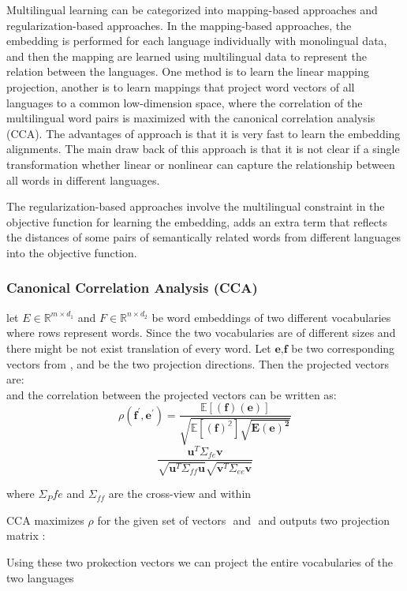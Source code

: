 Multilingual learning can be categorized into mapping-based approaches and regularization-based approaches. In the mapping-based approaches, the embedding is performed for each language individually with monolingual data, and then the mapping are learned using multilingual data to represent the relation between the languages. One method is to learn the linear mapping projection, another is to learn mappings that project word vectors of all languages to a common low-dimension space, where the correlation of the multilingual word pairs is maximized with the canonical correlation analysis (CCA). The advantages of approach is that it is very fast to learn the embedding alignments. The main draw back of this approach is that it is not clear if a single transformation whether linear or nonlinear can capture the relationship between all words in different languages.

The regularization-based approaches involve the multilingual constraint in the objective function for learning the embedding, adds an extra term that reflects the distances of some pairs of semantically related words from different languages into the objective function. 

\subsubsection{Canonical Correlation Analysis (CCA)}

let $E \in \mathbb{R}^{m \times d_1}$ and $F \in \mathbb{R}^{n \times d_2}$ be word embeddings of two different vocabularies where rows represent words. Since the two vocabularies are of different sizes and there might be not exist translation of every word. Let $\bm{e}$,$\bm{f}$ be two corresponding vectors from , and be the two projection directions. Then the projected vectors are:
\[ \] 
and the correlation between the projected vectors can be written as:
 \[\rho(\bm{f}^{\prime}, \bm{e}^{\prime}) = \frac{\mathbb{E[(\bm{f})(\bm{e})]}}{\sqrt{\mathbb{E[(\bm{f})^2]} \sqrt{\bm{E(\bm{e})^2}}}}\] 
 \[ \frac{\bm{u}^T\Sigma_{fe} \bm{v}}{\sqrt{\bm{u}^T \Sigma_{ff}\bm{u}} \sqrt{\bm{v}^T\Sigma_{ee}\bm{v}}} \]
 
 where $\Sigma_P{fe}$ and $\Sigma_{ff}$ are the cross-view and within 
 
 CCA maximizes $\rho$ for the given set of vectors ${}$ and ${}$ and outputs two projection matrix :
 
 Using these two prokection vectors we can project the entire vocabularies of the two languages  
 
